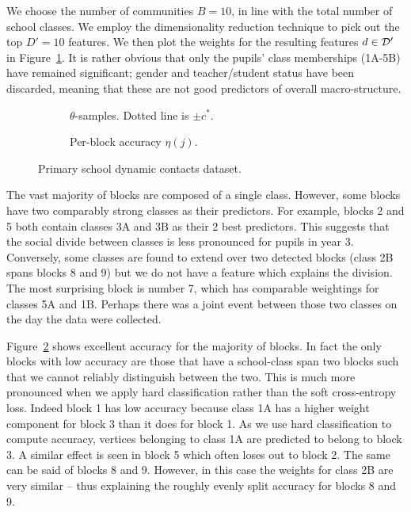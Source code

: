 We choose the number of communities $B=10$, in line with the total number of 
school classes. We 
employ the dimensionality reduction technique to pick out the top $D'=10$ features. 
We then plot the weights for the resulting features $d \in \mathcal{D}'$ 
in Figure~\ref{fig:school-null}. It is rather obvious
that only the pupils' class memberships (1A-5B) have remained
significant;
gender and teacher/student status have been discarded,
meaning that these are not good predictors of overall macro-structure.
%
\begin{figure}[!h]
	\centering
	\begin{subfigure}[t]{0.45\linewidth}
		\centering
		\caption{$\theta$-samples. Dotted line is $\pm c^*$.}
		\label{fig:school-null}
	\end{subfigure}
	\begin{subfigure}[t]{0.45\linewidth}
		\centering
		\caption{Per-block accuracy $\eta(j)$.}
		\label{fig:school-accuracy}
	\end{subfigure}
	\caption{Primary school dynamic contacts dataset.}
	\label{fig:school}
\end{figure}

The vast majority of blocks are composed of a single class. 
However, some blocks have two comparably strong classes as their predictors. 
For example, blocks 2 and 5 both contain classes 3A and 3B as their 2 best predictors. 
This suggests that the social divide between classes is less pronounced 
for pupils in year 3. Conversely, some classes are found to extend over two 
detected blocks (class 2B spans blocks 8 and 9) but we do 
not have a feature which explains the division. The most surprising block 
is number 7, which has comparable weightings for classes 5A and 1B. 
Perhaps there was a joint event between those two classes on the day 
the data were collected.

Figure~\ref{fig:school-accuracy} shows excellent accuracy for the majority of blocks. In fact the only blocks with low accuracy are those that have a school-class span two blocks such that we cannot reliably distinguish between the two. This is much more pronounced when we apply hard classification rather than the soft cross-entropy loss. Indeed block 1 has low accuracy because class 1A has a higher weight component for block 3 than it does for block 1. As we use hard classification to compute accuracy, vertices belonging to class 1A are predicted to belong to block 3. A similar effect is seen in block 5 which often loses out to block 2. The same can be said of blocks 8 and 9. However, in this case the weights for class 2B are very similar -- thus explaining the roughly evenly split accuracy for blocks 8 and 9.

